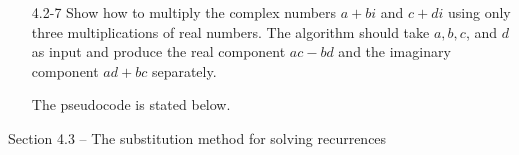 \documentclass{report}
\makeatletter
\renewenvironment{framed}{%
 \def\FrameCommand##1{\hskip\@totalleftmargin
 \fboxsep=\FrameSep\fbox{##1}}%
 \MakeFramed {\advance\hsize-\width
   \@totalleftmargin\z@ \linewidth\hsize
   \@setminipage}}%
 {\par\unskip\endMakeFramed}
\makeatother
\begin{document}
\begin{enumerate}
\begin{framed}
\end{framed}

\item[4.2{-}7]{Show how to multiply the complex numbers $a + b i$ and $c + di$
using only three multiplications of real numbers. The algorithm should take
$a, b, c$, and $d$ as input and produce the real component $ac - bd$ and the
imaginary component $ad + bc$ separately.}

\begin{framed}
The pseudocode is stated below.\\
\begin{algorithm}[H]
\SetAlgoNoEnd\DontPrintSemicolon
\BlankLine
{}
\end{algorithm}
\end{framed}

\end{enumerate}

\newpage

{\large Section 4.3 {--} The substitution method for solving recurrences}
\end{document}
